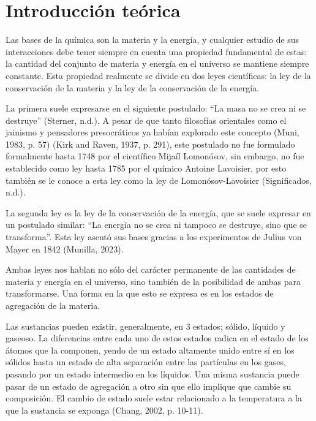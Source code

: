
\section{Introducción teórica}

Las bases de la química son la materia y la energía, y cualquier estudio de sus interacciones debe tener siempre en cuenta una propiedad fundamental de estas: la cantidad del conjunto de materia y energía en el universo se mantiene siempre constante. Esta propiedad realmente se divide en dos leyes científicas: la ley de la conservación de la materia y la ley de la conservación de la energía.

La primera suele expresarse en el siguiente postulado: ``La masa no se crea ni se destruye'' (Sterner, n.d.). A pesar de que tanto filosofías orientales como el jainismo y pensadores presocráticos ya habían explorado este concepto (Muni, 1983, p. 57) (Kirk and Raven, 1937, p. 291), este postulado no fue formulado formalmente hasta 1748 por el científico Mijaíl Lomonósov, sin embargo, no fue establecido como ley hasta 1785 por el químico Antoine Lavoisier, por esto  también se le conoce a esta ley como la ley de Lomonósov-Lavoisier (Significados, n.d.).

La segunda ley es la ley de la conservación de la energía, que se suele expresar en un postulado similar: ``La energía no se crea ni tampoco se destruye, sino que se transforma''. Esta ley asentó sus bases gracias a los experimentos de Julius von Mayer en 1842 (Munilla, 2023).

Ambas leyes nos hablan no sólo del carácter permanente de las cantidades de materia y energía en el universo, sino también de la posibilidad de ambas para transformarse. Una forma en la que esto se expresa es en los estados de agregación de la materia.

Las sustancias pueden existir, generalmente, en 3 estados; sólido, líquido y gaseoso. La diferencias entre cada uno de estos estados radica en el estado de los átomos que la componen, yendo de un estado altamente unido entre sí en los sólidos hasta un estado de alta separación entre las partículas en los gases, pasando por un estado intermedio en los líquidos. Una misma sustancia puede pasar de un estado de agregación a otro sin que ello implique que cambie su composición. El cambio de estado suele estar relacionado a la temperatura a la que la sustancia se exponga (Chang, 2002, p. 10-11).

